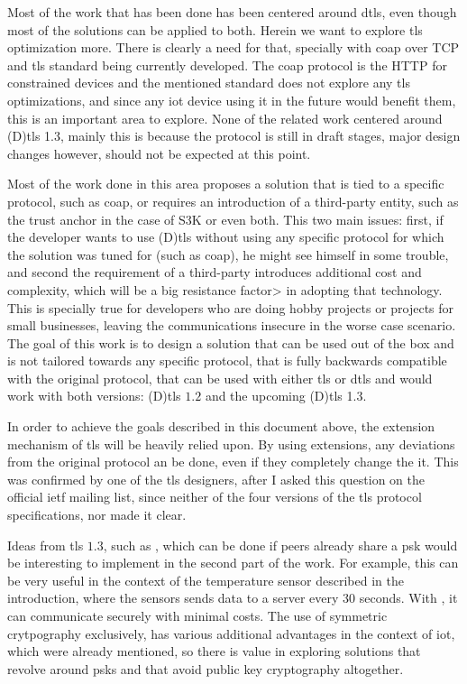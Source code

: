 \documentclass{llncs}
\begin{document}
Most of the work that has been done has been centered around \gls{dtls},
even though most of the solutions can be applied to both.
Herein we want to explore \gls{tls} optimization more. There is clearly a need for that, specially with \gls{coap} over
TCP and \gls{tls} standard being currently developed. The \gls{coap}\cite{RFC7252} protocol is the HTTP
for constrained devices and the mentioned standard does not explore any \gls{tls}
optimizations, and since any \gls{iot} device using it in the future would benefit
them, this is an important area to explore. None of the related work centered around
(D)\gls{tls} 1.3, mainly this is because the protocol is still in draft stages, major design changes however, should not be expected at this point.

Most of the work done in this area proposes a solution that is tied to a
specific protocol, such as \gls{coap}, or requires an introduction of a third-party
entity, such as the trust anchor in the case of S3K\cite{S3KScala62:online} or
even both. This two main issues: first, if the developer wants to use (D)\gls{tls}
without using any specific protocol for which the solution was tuned for (such as \gls{coap}),
he might see himself in some trouble, and second the requirement of a third-party
introduces additional cost and complexity, which will be a big resistance factor>
in adopting that technology. This is specially true for developers who are doing
hobby projects or projects for small businesses, leaving the communications insecure
in the worse case scenario. The goal of this work is to design a solution that can be used out
of the box and is not tailored towards any specific protocol, that is fully backwards
compatible with the original protocol, that can be used with either \gls{tls}
or \gls{dtls} and would work with both versions: (D)\gls{tls} $1.2$ and the upcoming
(D)\gls{tls} 1.3.

In order to achieve the goals described in this document above, the extension
mechanism of \gls{tls} will be heavily relied upon. By using extensions, any deviations from the original protocol an be done, even if they completely change the it. This was confirmed by
one of the \gls{tls} designers, after I asked this question on the official
\gls{ietf} mailing list\cite{ReTLSTLS31:online}, since neither of the four versions of the \gls{tls} protocol
specifications, nor  made it clear.

Ideas from \gls{tls} $1.3$, such as , which can be done if peers already share a \gls{psk} would be interesting to implement in the second part of the work.
For example, this can be very useful in the context of the temperature sensor
described in the introduction, where the sensors sends data to a server every
30 seconds. With , it can communicate securely with minimal costs.
The use of symmetric crytpography exclusively, has various additional advantages in the context
of \gls{iot}, which were already mentioned, so there is value in exploring solutions that revolve around
\gls{psk}s and that avoid public key cryptography altogether.
\end{document}
